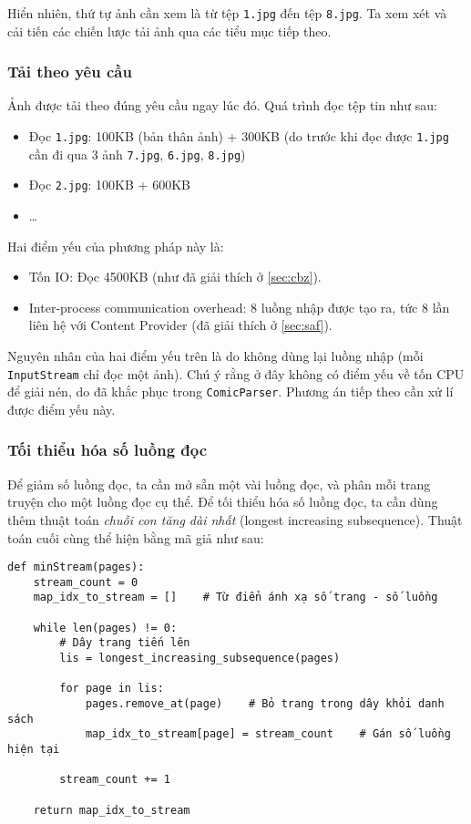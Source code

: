 \documentclass[../../../../thesis]{subfiles}
\begin{document}
Hiển nhiên, thứ tự ảnh cần xem là từ tệp \texttt{1.jpg} đến tệp
\texttt{8.jpg}. Ta xem xét và cải tiến các chiến lược tải ảnh qua các
tiểu mục tiếp theo.

\subsubsection{Tải theo yêu cầu}

Ảnh được tải theo đúng yêu cầu ngay lúc đó. Quá trình đọc tệp tin như sau:

\begin{itemize}
    \item
        Đọc \texttt{1.jpg}: 100KB (bản thân ảnh) + 300KB (do trước khi đọc được
        \texttt{1.jpg} cần đi qua 3 ảnh \texttt{7.jpg}, \texttt{6.jpg},
        \texttt{8.jpg})
    \item
        Đọc \texttt{2.jpg}: 100KB + 600KB
    \item
        \ldots{}
\end{itemize}

Hai điểm yếu của phương pháp này là:

\begin{itemize}
    \item Tốn IO: Đọc 4500KB (như đã giải thích ở \autoref{sec:cbz}).
    \item Inter-process communication overhead: 8 luồng nhập được tạo ra, tức 8
        lần liên hệ với Content Provider (đã giải thích ở \autoref{sec:saf}).
\end{itemize}

Nguyên nhân của hai điểm yếu trên là do không dùng lại luồng nhập (mỗi
\texttt{InputStream} chỉ đọc một ảnh). Chú ý rằng ở đây không có điểm yếu về tốn
CPU để giải nén, do đã khắc phục trong \texttt{ComicParser}. Phương án tiếp theo
cần xử lí được điểm yếu này.

\subsubsection{Tối thiểu hóa số luồng đọc}

Để giảm số luồng đọc, ta cần mở sẵn một vài luồng đọc, và phân mỗi trang truyện
cho một luồng đọc cụ thể. Để tối thiểu hóa số luồng đọc, ta cần dùng thêm thuật
toán \emph{chuỗi con tăng dài nhất} (longest increasing subsequence). Thuật toán
cuối cùng thể hiện bằng mã giả như sau:

\begin{verbatim}
def minStream(pages):
    stream_count = 0
    map_idx_to_stream = []    # Từ điển ánh xạ số trang - số luồng

    while len(pages) != 0:
        # Dây trang tiến lên
        lis = longest_increasing_subsequence(pages)

        for page in lis:
            pages.remove_at(page)    # Bỏ trang trong dây khỏi danh sách
            map_idx_to_stream[page] = stream_count    # Gán số luồng hiện tại

        stream_count += 1

    return map_idx_to_stream
\end{verbatim}
\end{document}
